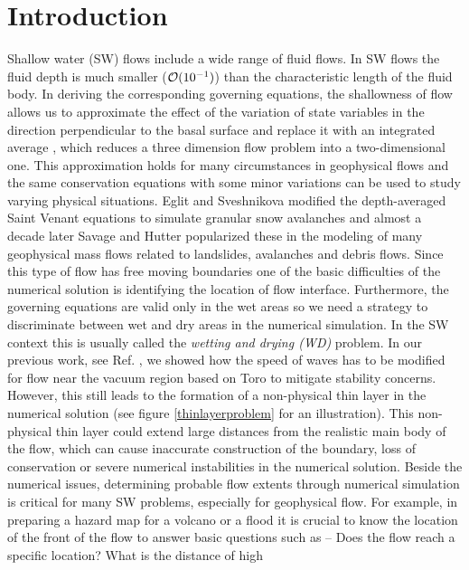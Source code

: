 \documentclass[letterpaper,10pt]{article}
\begin{document}
\section{Introduction} 
\label{introduction}
Shallow water (SW) flows include a wide range of fluid flows. In SW flows the fluid depth is much 
smaller (${\cal O}(10^{-1})$) than the characteristic length of the fluid body. In deriving the corresponding 
governing equations, the shallowness of flow allows us to approximate the effect of the variation of state variables in the direction perpendicular to the basal surface and replace
it with an integrated average \cite{SavageHutter}, which
reduces a three dimension flow problem into a two-dimensional one.
This approximation holds for many circumstances in geophysical flows and the same 
conservation equations with some minor variations can be used to study varying physical situations.
Eglit and Sveshnikova \cite{eglit1980mms} modified the depth-averaged Saint Venant equations to simulate granular snow avalanches and almost a decade later 
Savage and Hutter \cite{SavageHutter} popularized these in the modeling of many geophysical mass flows related to landslides, avalanches and debris flows. 
Since this type of flow has free moving boundaries one of the basic difficulties 
of the numerical solution is identifying the location of flow interface. 
Furthermore, the governing equations are valid only in the wet areas so we need a strategy to discriminate between wet and dry areas in the numerical simulation. 
In the SW context this is usually called the {\it wetting and drying (WD)} problem. %
In our previous work, see Ref. \cite{Patra2005}, we showed how the speed of waves has to be modified for flow near the vacuum region based on Toro \cite{ToroBook2001} to mitigate stability concerns. However, this still leads to the formation of a non-physical thin layer in the numerical solution (see figure \ref{thinlayerproblem} for an illustration).
This non-physical thin layer could extend large distances from the realistic main 
body of the flow, which can cause inaccurate construction of the boundary, loss of conservation or severe 
numerical instabilities in the numerical solution. 
Beside the numerical issues, determining probable flow extents through numerical simulation is critical for many SW problems, especially for geophysical flow. For example, in preparing a hazard map 
for a volcano or a flood it is crucial to know the location of the front of the flow to answer basic questions such as --  Does the flow reach a specific location? What is the distance of high 
\end{document}
